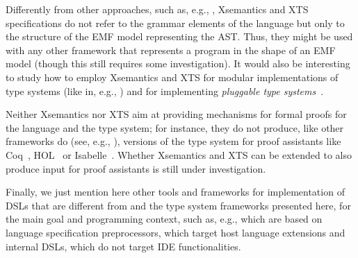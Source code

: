 Differently from other approaches, such as, e.g.,
\cite{Centaur,MPS,ASFSDF,Ruler,PLTRedex,EriLex,Neverlang2010}, Xsemantics and
XTS specifications do not refer to the grammar elements of the language but only
to the structure of the EMF model representing the AST.  Thus, they might be
used with any other framework that represents a program in the shape of an EMF
model (though this still requires some investigation).
It would also be interesting to study how to employ Xsemantics and XTS for
modular implementations of type systems (like in, e.g.,
\cite{JastAdd,Neverlang2010,Spoofax2010}) and for implementing \emph{pluggable
type systems}~\cite{Brac04a}.

Neither Xsemantics nor XTS aim at providing mechanisms for formal proofs for the
language and the type system; for instance, they do not produce, like other
frameworks do (see, e.g., \cite{Ott}), versions of the type system for proof
assistants like Coq~\cite{Coq}, HOL~\cite{HOL} or Isabelle~\cite{Isabelle}.
Whether Xsemantics and XTS can be extended to also produce input for proof
assistants is still under investigation.

Finally, we just mention here other tools and frameworks for implementation of
DSLs that are different from \xtext{} and the type system frameworks presented
here, for the main goal and programming context, such as, e.g.,
\cite{JST98,MetaBorg06,MontiCore10} which are based on language specification
preprocessors, \cite{XMF08,LanguageBoxes09} which target host language
extensions and internal DSLs, \cite{ASFSDF,Ruler,PLTRedex} which do not target
IDE functionalities.